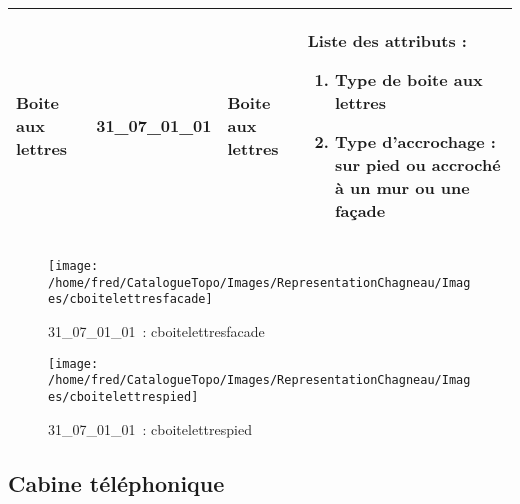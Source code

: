 \documentclass[12pt,titlepage]{book}
\begin{document}
\renewcommand{\arraystretch}{1.2}
\begin{supertabular}{|p{10cm}|c|p{13cm}|p{12cm}|}
 Boite aux lettres & 31\_07\_01\_01 & Boite aux lettres & Liste des attributs :
\begin{enumerate}
  \item Type de boite aux lettres  \item Type d'accrochage : sur pied ou accroché à un mur ou une façade\end{enumerate}
\\
\hline
\end{supertabular}
\begin{figure}[h!]
  \hfill         %
  \begin{minipage}[t]{3cm}
    \begin{center}
      \texttt{[image: /home/fred/CatalogueTopo/Images/RepresentationChagneau/Images/cboitelettresfacade]}
      \caption[~31\_07\_01\_01]{\small{31\_07\_01\_01~:} \tiny{cboitelettresfacade}}\label{cboitelettresfacade}
    \end{center}
  \end{minipage}
  \begin{minipage}[t]{3cm}
    \begin{center}
      \texttt{[image: /home/fred/CatalogueTopo/Images/RepresentationChagneau/Images/cboitelettrespied]}
      \caption[~31\_07\_01\_01]{\small{31\_07\_01\_01~:} \tiny{cboitelettrespied}}\label{cboitelettrespied}
    \end{center}
  \end{minipage}
\end{figure}


\subsection{Cabine téléphonique}
\noindent
\vspace{\baselineskip}
\end{document}

